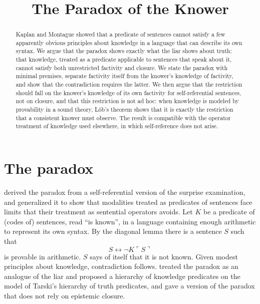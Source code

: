\documentclass{situationist-preprint}
\title{The Paradox of the Knower}
\begin{document}
\maketitle

\begin{abstract}
Kaplan and Montague showed that a predicate of sentences cannot satisfy a few apparently obvious principles about knowledge in a language that can describe its own syntax. We argue that the paradox shows exactly what the liar shows about truth: that knowledge, treated as a predicate applicable to sentences that speak about it, cannot satisfy both unrestricted factivity and closure. We state the paradox with minimal premises, separate factivity itself from the knower's knowledge of factivity, and show that the contradiction requires the latter. We then argue that the restriction should fall on the knower's knowledge of its own factivity for self-referential sentences, not on closure, and that this restriction is not ad hoc: when knowledge is modeled by provability in a sound theory, Löb's theorem shows that it is exactly the restriction that a consistent knower must observe. The result is compatible with the operator treatment of knowledge used elsewhere, in which self-reference does not arise.
\end{abstract}

\section{The paradox}

\citet{KaplanMontague1960} derived the paradox from a self-referential version of the surprise examination, and \citet{Montague1963} generalized it to show that modalities treated as predicates of sentences face limits that their treatment as sentential operators avoids. Let $K$ be a predicate of (codes of) sentences, read \enquote{is known}, in a language containing enough arithmetic to represent its own syntax. By the diagonal lemma there is a sentence $S$ such that
\begin{equation}\label{e:knower}
S \leftrightarrow \neg K\ulcorner S \urcorner
\end{equation}
is provable in arithmetic. $S$ says of itself that it is not known. Given modest principles about knowledge, contradiction follows. \citet{Anderson1983} treated the paradox as an analogue of the liar and proposed a hierarchy of knowledge predicates on the model of Tarski's hierarchy of truth predicates, and \citet{Cross2001} gave a version of the paradox that does not rely on epistemic closure.
\end{document}
